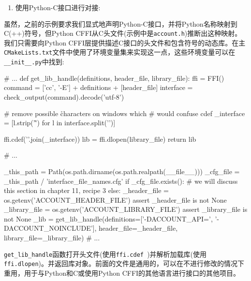\begin{enumerate}
\begin{codebox}[cmake]
include(GenerateExportHeader)
generate_export_header(account
  BASE_NAME account
  )
\end{codebox}

\item 使用Python-C接口进行对接:


\end{enumerate}


虽然，之前的示例要求我们显式地声明Python-C接口，并将Python名称映射到C(++)符号，但Python CFFI从C头文件(示例中是\texttt{account.h})推断出这种映射。我们只需要向Python CFFI层提供描述C接口的头文件和包含符号的动态库。在主\texttt{CMakeLists.txt}文件中使用了环境变量集来实现这一点，这些环境变量可以在\texttt{\_\_init\_\_.py}中找到:

\begin{codebox}[python]
# ...
def get_lib_handle(definitions, header_file, library_file):
  ffi = FFI()
  command = ['cc', '-E'] + definitions + [header_file]
  interface = check_output(command).decode('utf-8')

  # remove possible \r characters on windows which
  # would confuse cdef
  _interface = [l.strip('\r') for l in interface.split('\n')]

  ffi.cdef('\n'.join(_interface))
  lib = ffi.dlopen(library_file)
  return lib

# ...

_this_path = Path(os.path.dirname(os.path.realpath(__file__)))
_cfg_file = _this_path / 'interface_file_names.cfg'
if _cfg_file.exists():
    # we will discuss this section in chapter 11, recipe 3
else:
  _header_file = os.getenv('ACCOUNT_HEADER_FILE')
  assert _header_file is not None
  _library_file = os.getenv('ACCOUNT_LIBRARY_FILE')
  assert _library_file is not None
  _lib = get_lib_handle(definitions=['-DACCOUNT_API=', '-DACCOUNT_NOINCLUDE'],
  header_file=_header_file,
  library_file=_library_file)
# ...
\end{codebox}

\texttt{get\_lib\_handle}函数打开头文件(使用\texttt{ffi.cdef })并解析加载库(使用\texttt{ ffi.dlopen})。并返回库对象。前面的文件是通用的，可以在不进行修改的情况下重用，用于与Python和C或使用Python CFFI的其他语言进行接口的其他项目。

